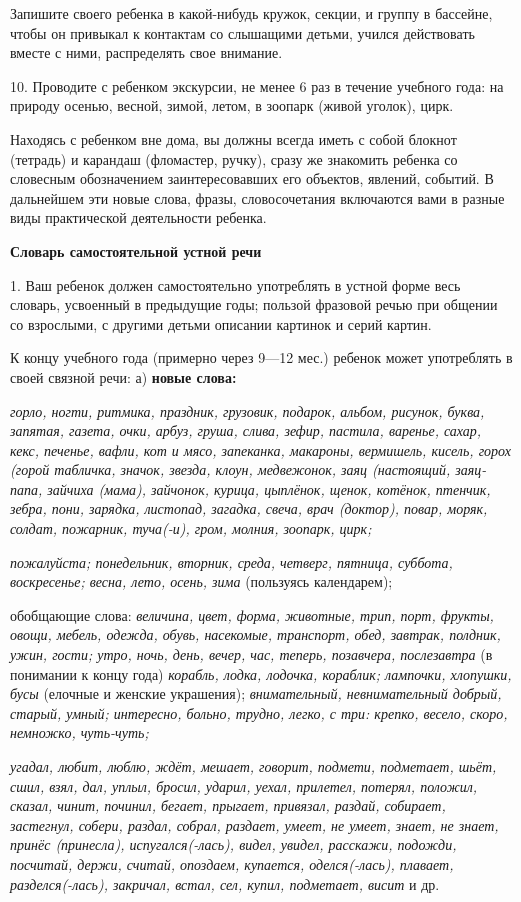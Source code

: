 \documentclass[a5paper]{book}
\renewcommand{\emph}[1]{\textit{#1}}
\begin{document}
Запишите своего ребенка в какой-нибудь кружок, секции, и группу в
бассейне, чтобы он привыкал к контактам со слышащими детьми, учился
действовать вместе с ними, распределять свое внимание.

10. Проводите с ребенком экскурсии, не менее 6 раз в течение учебного
года: на природу осенью, весной, зимой, летом, в зоопарк (живой уголок),
цирк.

Находясь с ребенком вне дома, вы должны всегда иметь с собой блокнот
(тетрадь) и карандаш (фломастер, ручку), сразу же знакомить ребенка со
словесным обозначением заинтересовавших его объектов, явлений, событий.
В дальнейшем эти новые слова, фразы, словосочетания включаются вами в
разные виды практической деятельности ребенка.

\textbf{Словарь самостоятельной устной речи}

1. Ваш ребенок должен самостоятельно употреблять в устной форме весь
словарь, усвоенный в предыдущие годы; пользой фразовой речью при общении
со взрослыми, с другими детьми описании картинок и серий картин.

К концу учебного года (примерно через 9---12 мес.) ребенок может
употреблять в своей связной речи: а) \textbf{новые слова:}

\emph{горло, ногти, ритмика, праздник, грузовик, подарок, альбом,
рисунок, буква, запятая, газета, очки, арбуз, груша, слива, зефир,
пастила, варенье, сахар, кекс, печенье, вафли, кот и мясо, запеканка,
макароны, вермишель, кисель, горох (горой табличка, значок, звезда,
клоун, медвежонок, заяц (настоящий, заяц-папа, зайчиха (мама), зайчонок,
курица, цыплёнок, щенок, котёнок, птенчик, зебра, пони, зарядка,
листопад, загадка, свеча, врач (доктор), повар, моряк, солдат, пожарник,
туча(-и), гром, молния, зоопарк, цирк;}

\emph{пожалуйста; понедельник, вторник, среда, четверг, пятница,
суббота, воскресенье; весна, лето, осень, зима} (пользуясь календарем);

обобщающие слова: \emph{величина, цвет, форма, животные, трип, порт,
фрукты, овощи, мебель, одежда, обувь, насекомые, транспорт, обед,
завтрак, полдник, ужин, гости; утро, ночь, день, вечер, час, теперь,
позавчера, послезавтра} (в понимании к концу года) \emph{корабль, лодка,
лодочка, кораблик; лампочки, хлопушки, бусы} (елочные и женские
украшения); \emph{внимательный, невнимательный добрый, старый, умный;
интересно, больно, трудно, легко, с три: крепко, весело, скоро,
немножко, чуть-чуть;}

\emph{угадал, любит, люблю, ждёт, мешает, говорит, подмети, подметает,
шьёт, сшил, взял, дал, уплыл, бросил, ударил, уехал, прилетел, потерял,
положил, сказал, чинит, починил, бегает, прыгает, привязал, раздай,
собирает, застегнул, собери, раздал, собрал, раздает, умеет, не умеет,
знает, не знает, принёс (принесла), испугался(-лась), видел, увидел,
расскажи, подожди, посчитай, держи, считай, опоздаем, купается,
оделся(-лась), плавает, разделся(-лась), закричал, встал, сел, купил,
подметает, висит} и др.
\end{document}
